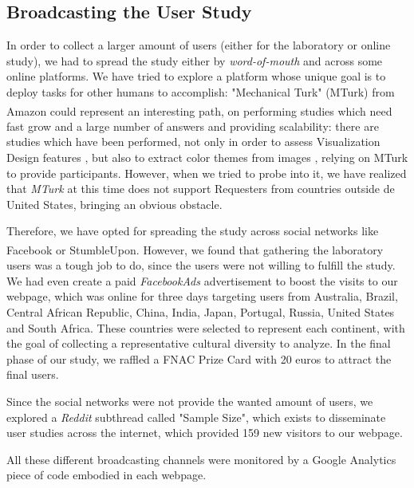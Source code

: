 \subsection{Broadcasting the User Study}
\label{sec:results_divulgation}
%
In order to collect a larger amount of users (either for the laboratory or online study), we had to spread the study either by \emph{word-of-mouth} and
across some online platforms. We have tried to explore a platform whose unique goal is to deploy tasks for other humans to accomplish: "Mechanical Turk"
(MTurk) from Amazon\textsuperscript{\textregistered} could represent an interesting path, on performing studies which need fast grow and a large number
of answers and providing scalability: there are studies which have been performed, not only in order to assess Visualization Design features
\cite{Heer2010}, but also to extract color themes from images \cite{Lin2013}, relying on MTurk to provide participants. However, when we tried to probe
into it, we have realized that \emph{MTurk} at this time does not support Requesters from countries outside de United States, bringing an obvious obstacle. \par
%
Therefore, we have opted for spreading the study across social networks like Facebook\textsuperscript{\textregistered} or StumbleUpon. However, we found
that gathering the laboratory users was a tough job to do, since the users were not willing to fulfill the study. We had even create a paid \emph{FacebookAds}
advertisement to boost the visits to our webpage, which was online for three days targeting users from Australia, Brazil, Central African Republic, China,
India, Japan, Portugal, Russia, United States and South Africa. These countries were selected to represent each continent, with the goal of collecting a
representative cultural diversity to analyze. In the final phase of our study, we raffled a FNAC Prize Card with 20 euros to attract the final users. \par
%
Since the social networks were not provide the wanted amount of users, we explored a \emph{Reddit} subthread called "Sample Size", which exists to disseminate
user studies across the internet, which provided 159 new visitors to our webpage. \par
%
All these different broadcasting channels were monitored by a Google Analytics piece of code embodied in each webpage.
%
